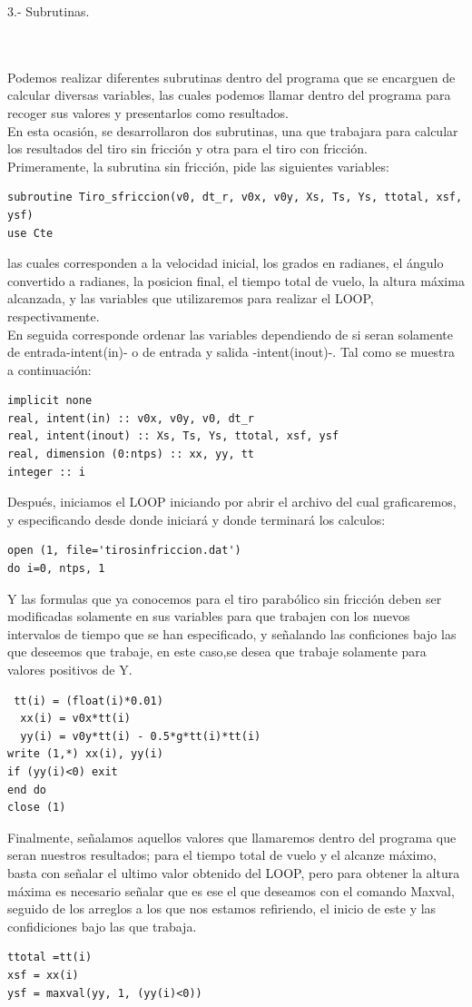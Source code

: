 \documentclass[12pt]{article}
\begin{document}
\begin{large}
3.- Subrutinas.
\end{large}\\
\\
Podemos realizar diferentes subrutinas dentro del programa que se encarguen de calcular diversas variables, las cuales podemos llamar dentro del programa para recoger sus valores y presentarlos como resultados.\\
En esta ocasión, se desarrollaron dos subrutinas, una que trabajara para calcular los resultados del tiro sin fricción y otra para el tiro con fricción.\\
Primeramente, la subrutina sin fricción, pide las siguientes variables:
\begin{verbatim}
subroutine Tiro_sfriccion(v0, dt_r, v0x, v0y, Xs, Ts, Ys, ttotal, xsf, ysf)
use Cte
\end{verbatim}
las cuales corresponden a la velocidad inicial, los grados en radianes, el ángulo convertido a radianes, la posicion final, el tiempo total de vuelo, la altura máxima alcanzada, y las variables que utilizaremos para realizar el LOOP, respectivamente.\\
En seguida corresponde ordenar las variables dependiendo de si seran solamente de entrada-intent(in)- o de entrada y salida -intent(inout)-. Tal como se muestra a continuación:
\begin{verbatim}
implicit none
real, intent(in) :: v0x, v0y, v0, dt_r
real, intent(inout) :: Xs, Ts, Ys, ttotal, xsf, ysf
real, dimension (0:ntps) :: xx, yy, tt
integer :: i
\end{verbatim}
Después, iniciamos el LOOP iniciando por abrir el archivo del cual graficaremos, y especificando desde donde iniciará y donde terminará los calculos:
\begin{verbatim}
open (1, file='tirosinfriccion.dat')
do i=0, ntps, 1
\end{verbatim}
Y las formulas que ya conocemos para el tiro parabólico sin fricción deben ser modificadas solamente en sus variables para que trabajen con los nuevos intervalos de tiempo que se han especificado, y señalando las conficiones bajo las que deseemos que trabaje, en este caso,se desea que trabaje solamente para valores positivos de Y.
\begin{verbatim}
 tt(i) = (float(i)*0.01)
  xx(i) = v0x*tt(i) 
  yy(i) = v0y*tt(i) - 0.5*g*tt(i)*tt(i)
write (1,*) xx(i), yy(i)
if (yy(i)<0) exit
end do
close (1)
\end{verbatim}
Finalmente, señalamos aquellos valores que llamaremos dentro del programa que seran nuestros resultados; para el tiempo total de vuelo y el alcanze máximo, basta con señalar el ultimo valor obtenido del LOOP, pero para obtener la altura máxima es necesario señalar que es ese el que deseamos con el comando Maxval, seguido de los arreglos a los que nos estamos refiriendo, el inicio de este y las confidiciones bajo las que trabaja.
\begin{verbatim}
ttotal =tt(i)
xsf = xx(i)
ysf = maxval(yy, 1, (yy(i)<0))
\end{verbatim}
\end{document}
